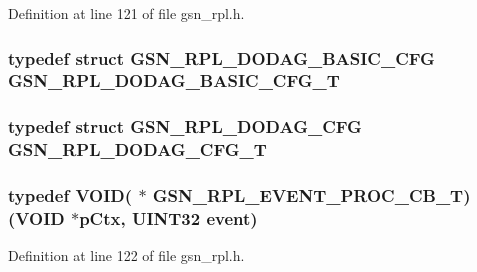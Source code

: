 Definition at line 121 of file gsn\_\-rpl.h.

\hypertarget{a00579_a71848a0de1043102d9f7e8054a42d56b}{
\subsubsection[{GSN\_\-RPL\_\-DODAG\_\-BASIC\_\-CFG\_\-T}]{\setlength{\rightskip}{0pt plus 5cm}typedef struct {\bf GSN\_\-RPL\_\-DODAG\_\-BASIC\_\-CFG} {\bf GSN\_\-RPL\_\-DODAG\_\-BASIC\_\-CFG\_\-T}}}
\label{a00579_a71848a0de1043102d9f7e8054a42d56b}
\hypertarget{a00579_a64e20c2e6a33dd3586f70b9996040d27}{
\subsubsection[{GSN\_\-RPL\_\-DODAG\_\-CFG\_\-T}]{\setlength{\rightskip}{0pt plus 5cm}typedef struct {\bf GSN\_\-RPL\_\-DODAG\_\-CFG} {\bf GSN\_\-RPL\_\-DODAG\_\-CFG\_\-T}}}
\label{a00579_a64e20c2e6a33dd3586f70b9996040d27}
\hypertarget{a00579_ad5cea0d221a0fad0b30b4a9e075a12ed}{
\subsubsection[{GSN\_\-RPL\_\-EVENT\_\-PROC\_\-CB\_\-T}]{\setlength{\rightskip}{0pt plus 5cm}typedef VOID( $\ast$ {\bf GSN\_\-RPL\_\-EVENT\_\-PROC\_\-CB\_\-T})(VOID $\ast$pCtx, {\bf UINT32} event)}}
\label{a00579_ad5cea0d221a0fad0b30b4a9e075a12ed}


Definition at line 122 of file gsn\_\-rpl.h.

